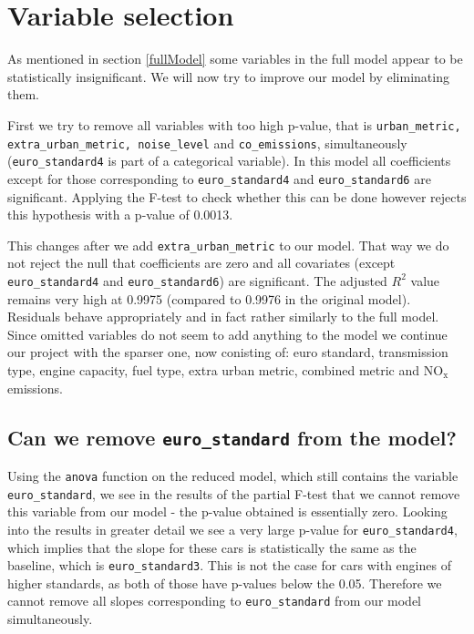 \documentclass[12pt]{article}
\begin{document}
\section{Variable selection} \label{varSec}
As mentioned in section \ref{fullModel} some variables in the full model appear to be statistically insignificant. We will now try
to improve our model by eliminating them. 

First we try to remove all variables with too high p-value, that is \texttt{urban\_metric, extra\_urban\_metric, noise\_level} 
and \texttt{co\_emissions}, simultaneously (\texttt{euro\_standard4} is 
part of a categorical variable). In this model all coefficients except for those corresponding to \texttt{euro\_standard4} and 
\texttt{euro\_standard6} are significant. Applying the F-test to check whether this can be done however rejects this hypothesis with
a p-value of 0.0013.

This changes after  we add \texttt{extra\_urban\_metric} to our model. That way we do not reject the null that coefficients are
zero and all covariates (except \texttt{euro\_standard4} and \texttt{euro\_standard6}) are significant. The adjusted $R^2$ value
remains very high at 0.9975 (compared to 0.9976 in the original model). Residuals behave appropriately and in fact rather similarly
to the full model. Since omitted variables do not seem to add anything to the model we continue our project with the 
sparser one, now conisting of: euro standard, transmission type, engine capacity, fuel type, extra urban metric, combined metric and 
$\text{NO}_\text{x}$ emissions.

\subsection{Can we remove \texttt{euro\_standard} from the model?}
Using the \texttt{anova} function on the reduced model, which still contains the variable \texttt{euro\_standard}, we see in the results
of the partial F-test that we cannot remove this variable from our model - the p-value obtained is essentially zero. 
Looking into the results in greater detail 
we see a very large p-value for \texttt{euro\_standard4}, which implies that the slope for these cars is statistically the same as the 
baseline, which is \texttt{euro\_standard3}. This is not the case for cars with engines of higher standards, as both of those have p-values
below the 0.05. Therefore we cannot remove all slopes corresponding to \texttt{euro\_standard} from our model simultaneously.
\end{document}
